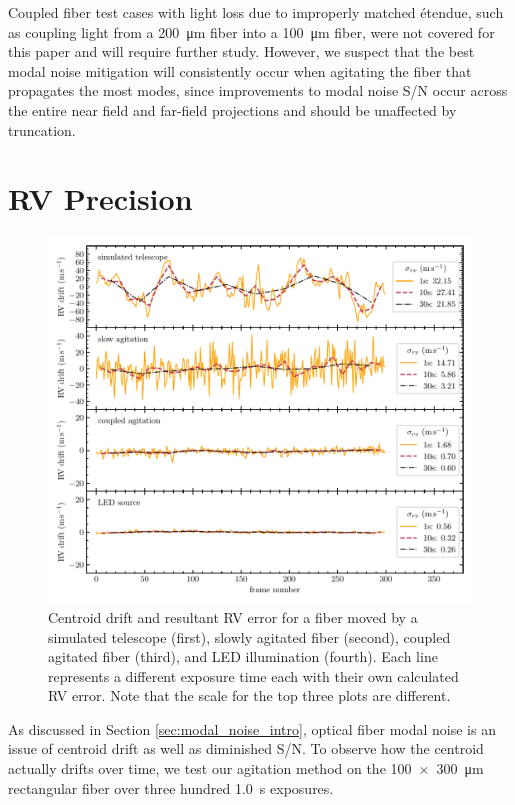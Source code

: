 Coupled fiber test cases with light loss due to improperly matched \'etendue, such as coupling light from a \SI{200}{\micro\meter} fiber into a \SI{100}{\micro\meter} fiber, were not covered for this paper and will require further study. However, we suspect that the best modal noise mitigation will consistently occur when agitating the fiber that propagates the most modes, since improvements to modal noise S/N occur across the entire near field and far-field projections and should be unaffected by truncation.

\section{RV Precision}
\label{sec:rv_precision}

\begin{figure}
\centering
	\includegraphics[width=\textwidth]{figures-2/rv_error.pdf}
	\caption{Centroid drift and resultant RV error for a fiber moved by a simulated telescope (first), slowly agitated fiber (second), coupled agitated fiber (third), and LED illumination (fourth). Each line represents a different exposure time each with their own calculated RV error. Note that the scale for the top three plots are different.}
\label{fig:rv_error}
\end{figure}

As discussed in Section \ref{sec:modal_noise_intro}, optical fiber modal noise is an issue of centroid drift as well as diminished S/N. To observe how the centroid actually drifts over time, we test our agitation method on the \SI{100x300}{\micro\meter} rectangular fiber over three hundred \SI{1.0}{\second} exposures.

